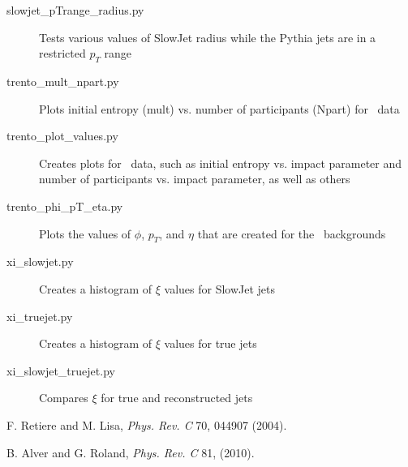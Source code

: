 \documentclass[11pt]{article}
\begin{document}
\begin{description}
\item[slowjet\_pTrange\_radius.py] Tests various values of SlowJet radius while the Pythia jets are in a restricted $p_T$ range
%
\item[trento\_mult\_npart.py] Plots initial entropy (mult) vs. number of participants (Npart) for \trento\ data
\item[trento\_plot\_values.py] Creates plots for \trento\ data, such as initial entropy vs. impact parameter and number of participants vs. impact parameter, as well as others
\item[trento\_phi\_pT\_eta.py] Plots the values of $\phi$, $p_T$, and $\eta$ that are created for the \trento\ backgrounds
%
\item[xi\_slowjet.py] Creates a histogram of $\xi$ values for SlowJet jets
\item[xi\_truejet.py] Creates a histogram of $\xi$ values for true jets
\item[xi\_slowjet\_truejet.py] Compares $\xi$ for true and reconstructed jets
\end{description}


\begin{thebibliography}{10}

F. Retiere and M. Lisa, {\em Phys. Rev. C} 70, 044907 (2004).

B. Alver and G. Roland, {\em Phys. Rev. C} 81, (2010).

\end{thebibliography}
\end{document}
